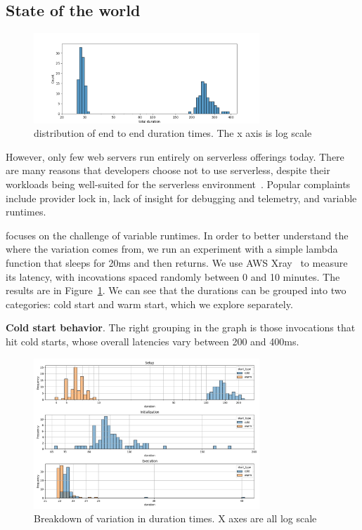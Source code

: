 \subsection{State of the world}


\begin{figure}[t!]
    \centering
      \includegraphics[width=8.5cm]{img/lambda_total_durations.png}
      \caption{ distribution of end to end duration times. The x axis is log scale }
    \label{fig:lambda-total-durations}
\end{figure}

However, only few web servers run entirely on serverless offerings today. There
are many reasons that developers choose not to use serverless, despite their
workloads being well-suited for the serverless
environment~\cite{not-lambda-blog,reddit-serverless2}. Popular complaints
include provider lock in, lack of insight for debugging and telemetry, and
variable runtimes.


\Sys{} focuses on the challenge of variable runtimes. In order to better
understand the where the variation comes from, we run an experiment with a
simple lambda function that sleeps for 20ms and then returns. We use AWS
Xray~\cite{aws-xray} to measure its latency, with incovations spaced randomly
between 0 and 10 minutes. The results are in
Figure~\ref{fig:lambda-total-durations}. We can see that the durations can be
grouped into two categories: cold start and warm start, which we explore
separately.

\textbf{Cold start behavior}.
% 
The right grouping in the graph is those invocations that hit cold starts, whose
overall latencies vary between 200 and 400ms.

\begin{figure}[t!]
  \centering
    \includegraphics[width=8.5cm]{img/lambda_duration_breakdown.png}
    \caption{ Breakdown of variation in duration times. X axes are all log scale }
  \label{fig:lambda-durations-breakdown}
\end{figure}

